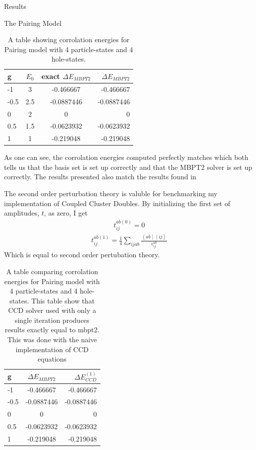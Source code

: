 \documentclass[twoside,english]{uiofysmaster}
\begin{document}
\begin{chapter}{Results}
\begin{section}{The Pairing Model}
		\begin{table}[H]
			\begin{center}
				\begin{tabular}[center]{l | c | c | r}
					g & $E_0$ & exact $ \Delta E_{MBPT2}$  & $\Delta E_{MBPT2}$ \\
					\hline
					-1 & 3 & -0.466667 & -0.466667 \\
					-0.5 & 2.5 & -0.0887446 & -0.0887446 \\
					0 & 2 & 0 & 0 \\
					0.5 & 1.5 & -0.0623932 & -0.0623932 \\
					1 & 1 & -0.219048 & -0.219048
				\end{tabular}
			\end{center}
			\caption{A table showing corrolation energies for Pairing model with 4 particle-states and 4 hole-states.  }
			\label{Results1}
		\end{table}
		As one can see, the corrolation energies computed perfectly matches which both tells us that the basis set is set up correctly and that the MBPT2 solver is set up correctly. The results presented also match the results found in \cite{Hjorth-Jensen2016}

		The second order perturbation theory is valuble for benchmarking my implementation of Coupled Cluster Doubles. By initializing the first set of amplitudes, $t$, as zero, I get
		\begin{align}
			t_{ij}^{ab(0)} = 0  
		\end{align}
		\begin{align}
			t_{ij}^{ab(1)} = \frac{1}{4} \sum_{ijab} \frac{\left<ab\middle|\middle|ij\right>}{\epsilon_{ij}^{ab}} 
 		\end{align}
 		Which is equal to second order pertubation theory. 
 		\begin{table}[H]
			\begin{center}
				\begin{tabular}[center]{l | c | r}
					g & $ \Delta E_{MBPT2}$  & $\Delta E_{CCD}^{(1)}$ \\
					\hline
					-1 & -0.466667 & -0.466667 \\
					-0.5 & -0.0887446 & -0.0887446 \\
					0 & 0 & 0 \\
					0.5 & -0.0623932 & -0.0623932 \\
					1 & -0.219048 & -0.219048
				\end{tabular}
			\end{center}
			\caption{A table comparing corrolation energies for Pairing model with 4 particle-states and 4 hole-states. This table show that CCD solver used with only a single iteration produces results exactly equal to mbpt2. This was done with the naive implementation of CCD equations}
			\label{Results2}
		\end{table}


\end{section}
\end{chapter}
\end{document}
